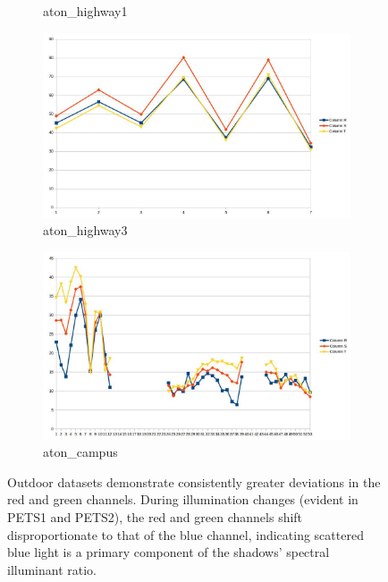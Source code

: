 \documentclass[12pt]{report}
\begin{document}
\begin{figure}
\begin{subfigure}{.49\linewidth}
  \caption{aton\_highway1}
\end{subfigure}
\hfill
\begin{subfigure}{.49\linewidth}
 \includegraphics[width=1\linewidth]{figures/rgshift_highway3.jpg}
  \caption{aton\_highway3}
\end{subfigure}
\hfill
\begin{subfigure}{.7\linewidth}
 \includegraphics[width=1\linewidth]{figures/rgshift_campus.jpg}
  \caption{aton\_campus}
\end{subfigure}

\caption{Outdoor datasets demonstrate consistently greater deviations in the red and green channels. During illumination changes (evident in PETS1 and PETS2), the red and green channels shift disproportionate to that of the blue channel, indicating scattered blue light is a primary component of the shadows' spectral illuminant ratio.}
\label{fig:rgshift_outdoor}
\end{figure}
\end{document}
